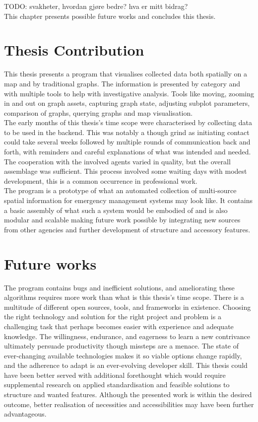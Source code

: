 TODO: svakheter, hvordan gjøre bedre? hva er mitt bidrag?  \\

This chapter presents possible future works and concludes this thesis.

\section{Thesis Contribution}
This thesis presents a program that visualises collected data both spatially on a map and by traditional graphs. The information is presented by category and with multiple tools to help with investigative analysis. Tools like moving, zooming in and out on graph assets, capturing graph state, adjusting subplot parameters, comparison of graphs, querying graphs and map visualisation.\\
The early months of this thesis's time scope were characterised by collecting data to be used in the backend. This was notably a though grind as initiating contact could take several weeks followed by multiple rounds of communication back and forth, with reminders and careful explanations of what was intended and needed. The cooperation with the involved agents varied in quality, but the overall assemblage was sufficient. This process involved some waiting days with modest development, this is a common occurrence in professional work.\\
The program is a prototype of what an automated collection of multi-source spatial information for emergency management systems may look like. It contains a basic assembly of what such a system would be embodied of and is also modular and scalable making future work possible by integrating new sources from other agencies and further development of structure and accessory features.

\section{Future works}
The program contains bugs and inefficient solutions, and ameliorating these algorithms requires more work than what is this thesis's time scope. There is a multitude of different open sources, tools, and frameworks in existence. Choosing the right technology and solution for the right project and problem is a challenging task that perhaps becomes easier with experience and adequate knowledge. The willingness, endurance, and eagerness to learn a new contrivance ultimately persuade productivity though missteps are a menace. The state of ever-changing available technologies makes it so viable options change rapidly, and the adherence to adapt is an ever-evolving developer skill. This thesis could have been better served with additional forethought which would require supplemental research on applied standardisation and feasible solutions to structure and wanted features. Although the presented work is within the desired outcome, better realisation of necessities and accessibilities may have been further advantageous.

